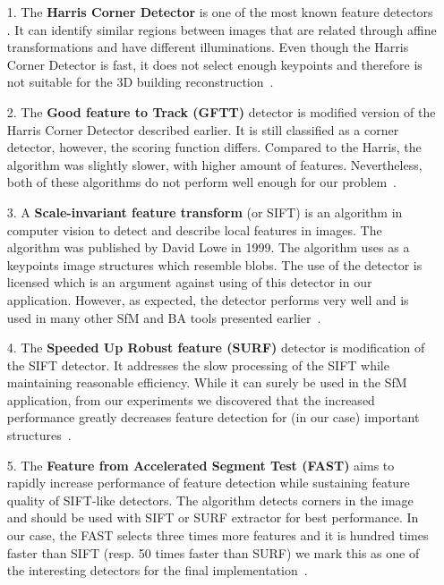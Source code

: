 	
\begin{itemize}
	\item[1.] The \textbf{Harris Corner Detector} is one of the most known feature detectors . It can identify similar regions between images that are related through affine transformations and have different illuminations. Even though the Harris Corner Detector is fast, it does not select enough keypoints and therefore is not suitable for the 3D building reconstruction~\cite{www:harris}.
	
	\item[2.] The \textbf{Good feature to Track (GFTT)} detector is modified version of the Harris Corner Detector described earlier. It is still classified as a corner detector, however, the scoring function differs. Compared to the Harris, the algorithm was slightly slower, with higher amount of features. Nevertheless, both of these algorithms do not perform well enough for our problem~\cite{article:gftt}.
	
	\item[3.] A \textbf{Scale-invariant feature transform} (or SIFT) is an algorithm in computer vision to detect and describe local features in images. The algorithm was published by David Lowe in 1999. The algorithm uses as a keypoints image structures which resemble blobs. The use of the detector is licensed which is an argument against using of this detector in our application. However, as expected, the detector performs very well and is used in many other SfM and BA tools presented earlier~\cite{article:sift}.
	
	\item[4.] The \textbf{Speeded Up Robust feature (SURF)} detector is modification of the SIFT detector. It addresses the slow processing of the SIFT while maintaining reasonable efficiency. While it can surely be used in the SfM application, from our experiments we discovered that the increased performance greatly decreases feature detection for (in our case) important structures~\cite{www:surf}.
	
	\item[5.] The \textbf{Feature from Accelerated Segment Test (FAST)} aims to rapidly increase performance of feature detection while sustaining feature quality of SIFT-like detectors. The algorithm detects corners in the image and should be used with SIFT or SURF extractor for best performance. In our case,  the FAST selects three times more features and it is hundred times faster than SIFT (resp. 50 times faster than SURF) we mark this as one of the interesting detectors for the final implementation~\cite{article:fast}.
	

\end{itemize}
